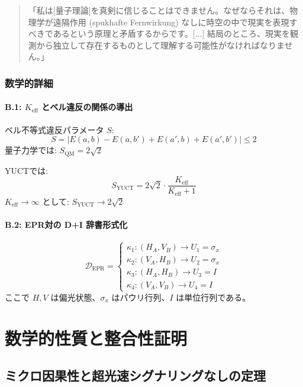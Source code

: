 \documentclass[11pt,a4paper]{article}
\begin{document}
	\begin{quote}
		「私は[量子理論]を真剣に信じることはできません。なぜならそれは、物理学が遠隔作用 (spukhafte Fernwirkung) なしに時空の中で現実を表現すべきであるという原理と矛盾するからです。[...] 結局のところ、現実を観測から独立して存在するものとして理解する可能性がなければなりません。」
	\end{quote}
	
	\subsubsection*{数学的詳細}
	
	\paragraph{B.1: $K_{\mathrm{eff}}$ とベル違反の関係の導出}
	ベル不等式違反パラメータ $S$:
	\begin{equation}
		S = |E(a,b) - E(a,b') + E(a',b) + E(a',b')| \leq 2
	\end{equation}
	量子力学では: $S_{\text{QM}} = 2\sqrt{2}$
	
	YUCTでは:
	\begin{equation}
		S_{\text{YUCT}} = 2\sqrt{2} \cdot \frac{K_{\mathrm{eff}}}{K_{\mathrm{eff}} + 1}
	\end{equation}
	$K_{\mathrm{eff}} \to \infty$ として: $S_{\text{YUCT}} \to 2\sqrt{2}$
	
	\paragraph{B.2: EPR対の \protect\mbox{D+I} 辞書形式化}
	\begin{equation}
		\mathcal{D}_{\text{EPR}} = 
		\begin{cases}
			\kappa_1: (H_A, V_B) \to U_1 = \sigma_x \\
			\kappa_2: (V_A, H_B) \to U_2 = \sigma_x \\
			\kappa_3: (H_A, H_B) \to U_3 = I \\
			\kappa_4: (V_A, V_B) \to U_4 = I
		\end{cases}
	\end{equation}
	ここで $H,V$ は偏光状態、$\sigma_x$ はパウリ行列、$I$ は単位行列である。
	
	\section{数学的性質と整合性証明}
	\subsection{ミクロ因果性と超光速シグナリングなしの定理}
	
\end{document}
